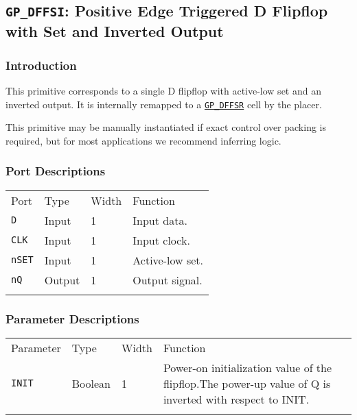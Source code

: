 \documentclass[11pt]{article}
\newcommand{\tokenstyle}[1]{\texttt{#1}}
\newcommand{\whenstyle}[1]{{\fontseries{sb}\selectfont#1}}
\newcommand{\tokenref}[2]{\hyperref[#2]{\tokenstyle{#1}}}
\newcommand{\thinhline}{\Xhline{1\arrayrulewidth}}
\newcommand{\thickhline}{\Xhline{2.5\arrayrulewidth}}
\begin{document}
\pagebreak
\subsection{\tokenstyle{GP\_DFFSI}: Positive Edge Triggered D Flipflop with Set and Inverted Output}
\label{gp-dffs}

\subsubsection{Introduction}
This primitive corresponds to a single D flipflop with active-low set and an inverted output. It is internally remapped
to a \tokenref{GP\_DFFSR}{gp-dffsr} cell by the placer.

This primitive may be manually instantiated if exact control over packing is required, but for most applications we
recommend inferring logic.

\subsubsection{Port Descriptions}

\begin{tabularx}{\textwidth}{lllX}
\thinhline
\whenstyle{Port} & \whenstyle{Type} & \whenstyle{Width} & \whenstyle{Function} \\
\thickhline
\tokenstyle{D} & Input & 1 & Input data. \\
\thinhline
\tokenstyle{CLK} & Input & 1 & Input clock. \\
\thinhline
\tokenstyle{nSET} & Input & 1 & Active-low set. \\
\thinhline
\tokenstyle{nQ} & Output & 1 & Output signal. \\
\thinhline
\end{tabularx}

\subsubsection{Parameter Descriptions}

\begin{tabularx}{\textwidth}{lllX}
\thinhline
\whenstyle{Parameter} & \whenstyle{Type} & \whenstyle{Width} & \whenstyle{Function} \\
\thickhline
\tokenstyle{INIT} & Boolean & 1 & Power-on initialization value of the flipflop.\newline The power-up value of Q is
inverted with respect to INIT.\\
\thinhline
\end{tabularx}
\end{document}
